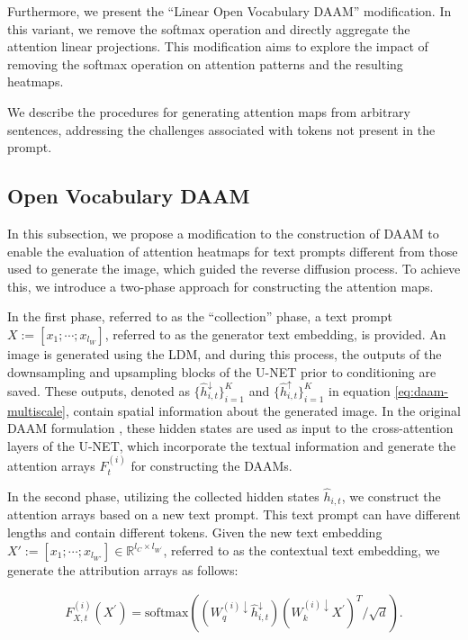 Furthermore, we present the ``Linear Open Vocabulary DAAM'' modification. In this variant, we remove the softmax operation and directly aggregate the attention linear projections. This modification aims to explore the impact of removing the softmax operation on attention patterns and the resulting heatmaps.

We describe the procedures for generating attention maps from arbitrary sentences, addressing the challenges associated with tokens not present in the prompt.

\subsection{Open Vocabulary DAAM}
\label{sec:methodology-ov-daam-softmax}


In this subsection, we propose a modification to the construction of DAAM\cite{DAAM} to enable the evaluation of attention heatmaps for text prompts different from those used to generate the image, which guided the reverse diffusion process. To achieve this, we introduce a two-phase approach for constructing the attention maps.

In the first phase, referred to as the ``collection'' phase, a text prompt $X := [x_1; \cdots; x_{l_W}]$, referred to as the generator text embedding, is provided. An image is generated using the LDM, and during this process, the outputs of the downsampling and upsampling blocks of the U-NET prior to conditioning are saved. These outputs, denoted as $\{\hat{h}_{i,t}^{\downarrow}\}_{i=1}^{K}$ and $\{\hat{h}_{i,t}^{\uparrow}\}_{i=1}^{K}$ in equation \ref{eq:daam-multiscale}, contain spatial information about the generated image. In the original DAAM formulation \cite{DAAM}, these hidden states are used as input to the cross-attention layers of the U-NET, which incorporate the textual information and generate the attention arrays $F_{t}^{(i)}$ for constructing the DAAMs.

In the second phase, utilizing the collected hidden states $\hat{h}_{i,t}$, we construct the attention arrays based on a new text prompt. This text prompt can have different lengths and contain different tokens. Given the new text embedding $X':= [x_1; \cdots; x_{l_{W'}}] \in \mathbb{R}^{l_C \times l_{W^\prime}}$, referred to as the contextual text embedding, we generate the attribution arrays as follows:

\begin{equation}
\label{eq:daam-multiscale-ov}
\begin{gathered}
     F_{X,t}^{(i)} \left (X^\prime \right ) = \text{softmax} \left( (W_q^{(i)\downarrow} \hat{h}_{i, t}^{\downarrow})  (W_k^{(i)\downarrow} X^\prime )^T / \sqrt{d} \right).
\end{gathered}
\end{equation}

